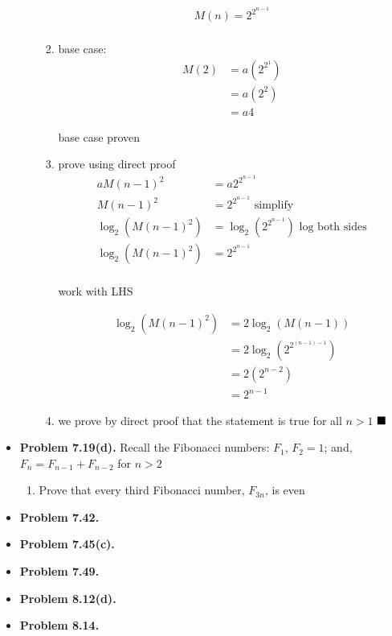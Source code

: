 \documentclass{article}
\begin{document}
\begin{itemize}
\begin{enumerate}[label=(a)]
\begin{enumerate}[label=(\roman*)]
                \begin{align*}
                    M(n) = 2^{2^{n-1}}\\
                \end{align*}
                \item base case:
                \begin{align*}
                    M(2) &= a(2^{2^1})\\
                         &= a(2^2)\\
                         &= a4
                \end{align*}
                \begin{center}
                    base case proven
                \end{center}
                \item prove using direct proof
                \begin{align*}
                    aM(n-1)^2 &= a2^{2^{n-1}}\\
                    M(n-1)^2 &= 2^{2^{n-1}} \text{ simplify}\\
                    \log_{2}(M(n-1)^2) &= \log_2(2^{2^{n-1}}) \text{ log both sides}\\
                    \log_{2}(M(n-1)^2) &= 2^{2^{n-1}}\\
                \end{align*}
                \begin{center}
                    work with LHS
                \end{center}
                \begin{align*}
                    \log_{2}(M(n-1)^2) & = 2 \log_{2}(M(n-1))\\
                                       & = 2 \log_{2}(2^{2^{(n-1) - 1}})\\
                                       & = 2(2^{n-2})\\
                                       & = 2^{n-1}
                \end{align*}
                \item we prove by direct proof that the statement is true for all $n > 1$ $\hfill\blacksquare$
            \end{enumerate}
        \end{enumerate}
        \item \textbf{Problem 7.19(d).} Recall the Fibonacci numbers: $F_1$, $F_2 = 1$; and, $F_n = F_{n-1} + F_{n-2}$ for $n > 2$
        \begin{enumerate}[label=(d)]
            \item Prove that every third Fibonacci number, $F_{3n}$, is even
        \end{enumerate}
        \item \textbf{Problem 7.42.}
        \item \textbf{Problem 7.45(c).}
        \item \textbf{Problem 7.49.}
        \item \textbf{Problem 8.12(d).}
        \item \textbf{Problem 8.14.}
    \end{itemize}
    
\end{document}
